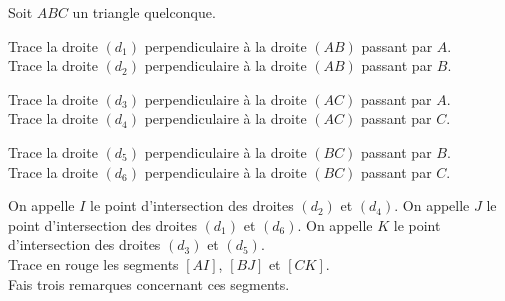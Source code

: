 Soit $ABC$ un triangle quelconque.
\begin{myenumerate}
\item Trace la droite $(d_1)$ perpendiculaire à la droite $(AB)$
  passant par $A$.
\\Trace la droite $(d_2)$ perpendiculaire à la droite $(AB)$ passant
par $B$.
\item Trace la droite $(d_3)$ perpendiculaire à la droite $(AC)$
  passant par $A$.
\\Trace la droite $(d_4)$ perpendiculaire à la droite $(AC)$ passant
par $C$.
\item Trace la droite $(d_5)$ perpendiculaire à la droite $(BC)$
  passant par $B$.
\\Trace la droite $(d_6)$ perpendiculaire à la droite $(BC)$ passant
par $C$.
\item On appelle $I$ le point d'intersection des droites $(d_2)$ et
  $(d_4)$. On appelle $J$ le point d'intersection des droites $(d_1)$
  et $(d_6)$. On appelle $K$ le point d'intersection des droites
  $(d_3)$ et $(d_5)$.
\\Trace en rouge les segments $[AI]$, $[BJ]$ et $[CK]$.
\\Fais trois remarques concernant ces segments.
\end{myenumerate}
